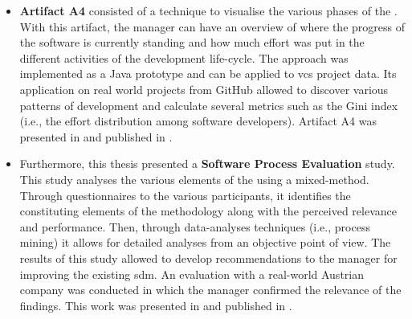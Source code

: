 \begin{itemize}
	\item \textbf{Artifact A4} consisted of a technique to visualise the various phases of the . With this artifact, the manager can have an overview of where the progress of the software is currently standing and how much effort was put in the different activities of the development life-cycle. The approach was implemented as a Java prototype and can be applied to \gls{vcs} project data. Its application on real world projects from GitHub allowed to discover various patterns of development and calculate several metrics such as the Gini index (i.e., the effort distribution among software developers). Artifact A4 was presented in  and published in \cite{DBLP:conf/ifip8-1/BalaKM20}.
	
	\item Furthermore, this thesis presented a \textbf{Software Process Evaluation} study. This study analyses the various elements of the  using a mixed-method. Through questionnaires to the various participants, it identifies the constituting elements of the methodology along with the perceived relevance and performance. Then, through data-analyses techniques (i.e., process mining) it allows for detailed analyses from an objective point of view. The results of this study allowed to develop recommendations to the manager for improving the existing \gls{sdm}. An evaluation with a real-world Austrian company was conducted in which the manager confirmed the relevance of the findings. This work was presented in  and published in \cite{Vavpotic2022}.
	
\end{itemize}

